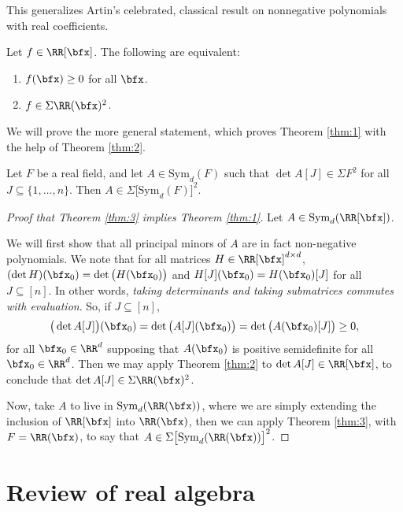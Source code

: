 \documentclass{article}
\newcommand*\Sym{\mathrm{Sym}}
\begin{document}
This generalizes Artin's celebrated, classical result on nonnegative polynomials with real coefficients. 

\begin{theorem}
    \label{thm:2}
    Let $f \in \RR[\bfx]$.
    The following are equivalent:
    \begin{enumerate}[label=(\roman*)]
        \item 
            $f(\bfx) \geq 0$ for all $\bfx$.
        \item 
            $f \in \Sigma \RR(\bfx)^2$.
    \end{enumerate}
\end{theorem}

We will prove the more general statement, which proves Theorem \ref{thm:1} with the help of Theorem \ref{thm:2}.

\begin{theorem}
    \label{thm:3}
    Let $F$ be a real field, and let $A \in \Sym_d(F)$ such that $\det A[J] \in \Sigma F^2$ for all $J \subseteq \{1,\ldots,n\}$.
Then $A \in \Sigma \big[\Sym_d(F)\big]^2$.
\end{theorem}

\begin{proof}[Proof that Theorem \ref{thm:3} implies Theorem \ref{thm:1}]
    Let $A \in \Sym_d(\RR[\bfx])$.

    We will first show that all principal minors of $A$ are in fact non-negative polynomials.
    We note that for all matrices $H \in \RR[\bfx]^{d \times d}$, $(\det H)(\bfx_0)=\det\big(H(\bfx_0)\big)$ and $H[J](\bfx_0) = H(\bfx_0)[J]$ for all $J \subseteq [n]$.
    In other words, \textit{taking determinants and taking submatrices commutes with evaluation}.
    So, if $J \subseteq [n]$,
    \[
        \big(\det A[J]\big)(\bfx_0)
        = \det \big(A[J](\bfx_0)\big)
        = \det \big(A(\bfx_0)[J]\big)
        \geq 0,
    \]
    for all $\bfx_0 \in \RR^d$ supposing that $A(\bfx_0)$ is positive semidefinite for all $\bfx_0 \in \RR^d$.
    Then we may apply Theorem \ref{thm:2} to $\det A[J] \in \RR[\bfx]$, to conclude that $\det A[J] \in \Sigma \RR(\bfx)^2$.

    Now, take $A$ to live in $\Sym_d(\RR(\bfx))$, where we are simply extending the inclusion of $\RR[\bfx]$ into $\RR(\bfx)$, then we can apply Theorem \ref{thm:3}, with $F = \RR(\bfx)$, to say that $A \in \Sigma\big[\Sym_d(\RR(\bfx))\big]^2$.
\end{proof}

\section{Review of real algebra}
\end{document}
